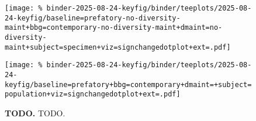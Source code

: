 \begin{figure*}

\raisebox{0.95cm}{%
  \texttt{[image: \%
binder-2025-08-24-keyfig/binder/teeplots/2025-08-24-keyfig/baseline=prefatory+bbg=contemporary+dmaint=+subject=specimen+viz=signchangedotplot+ext=.pdf]}%
}
%
\texttt{[image: \%
binder-2025-08-24-keyfig/binder/teeplots/2025-08-24-keyfig/baseline=prefatory-no-diversity-maint+bbg=contemporary-no-diversity-maint+dmaint=no-diversity-maint+subject=specimen+viz=signchangedotplot+ext=.pdf]}

\vspace{-6ex}

\texttt{[image: \%
binder-2025-08-24-keyfig/binder/teeplots/2025-08-24-keyfig/baseline=prefatory+bbg=contemporary+dmaint=+subject=population+viz=signchangedotplot+ext=.pdf]}

\vspace{-1ex}

\caption{
\textbf{TODO.}
TODO.
}
\label{fig:sign-change-prefatory-vs-contemporary}

\end{figure*}
